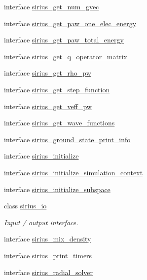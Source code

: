 \begin{DoxyCompactItemize}
\item 
interface \hyperlink{interfacesirius_1_1sirius__get__num__gvec}{sirius\+\_\+get\+\_\+num\+\_\+gvec}
\item 
interface \hyperlink{interfacesirius_1_1sirius__get__paw__one__elec__energy}{sirius\+\_\+get\+\_\+paw\+\_\+one\+\_\+elec\+\_\+energy}
\item 
interface \hyperlink{interfacesirius_1_1sirius__get__paw__total__energy}{sirius\+\_\+get\+\_\+paw\+\_\+total\+\_\+energy}
\item 
interface \hyperlink{interfacesirius_1_1sirius__get__q__operator__matrix}{sirius\+\_\+get\+\_\+q\+\_\+operator\+\_\+matrix}
\item 
interface \hyperlink{interfacesirius_1_1sirius__get__rho__pw}{sirius\+\_\+get\+\_\+rho\+\_\+pw}
\item 
interface \hyperlink{interfacesirius_1_1sirius__get__step__function}{sirius\+\_\+get\+\_\+step\+\_\+function}
\item 
interface \hyperlink{interfacesirius_1_1sirius__get__veff__pw}{sirius\+\_\+get\+\_\+veff\+\_\+pw}
\item 
interface \hyperlink{interfacesirius_1_1sirius__get__wave__functions}{sirius\+\_\+get\+\_\+wave\+\_\+functions}
\item 
interface \hyperlink{interfacesirius_1_1sirius__ground__state__print__info}{sirius\+\_\+ground\+\_\+state\+\_\+print\+\_\+info}
\item 
interface \hyperlink{interfacesirius_1_1sirius__initialize}{sirius\+\_\+initialize}
\item 
interface \hyperlink{interfacesirius_1_1sirius__initialize__simulation__context}{sirius\+\_\+initialize\+\_\+simulation\+\_\+context}
\item 
interface \hyperlink{interfacesirius_1_1sirius__initialize__subspace}{sirius\+\_\+initialize\+\_\+subspace}
\item 
class \hyperlink{classsirius_1_1sirius__io}{sirius\+\_\+io}
\begin{DoxyCompactList}\small\item\em Input / output interface. \end{DoxyCompactList}\item 
interface \hyperlink{interfacesirius_1_1sirius__mix__density}{sirius\+\_\+mix\+\_\+density}
\item 
interface \hyperlink{interfacesirius_1_1sirius__print__timers}{sirius\+\_\+print\+\_\+timers}
\item 
interface \hyperlink{interfacesirius_1_1sirius__radial__solver}{sirius\+\_\+radial\+\_\+solver}

\end{DoxyCompactItemize}
